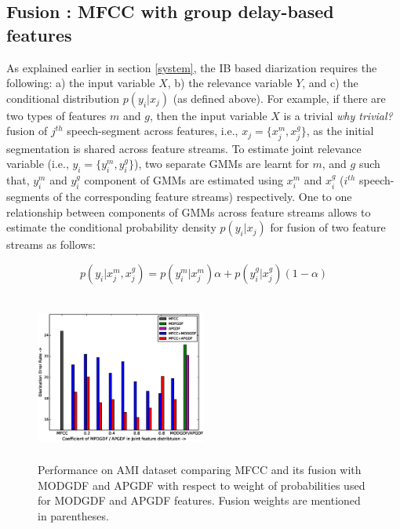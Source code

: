 \documentclass[conference]{IEEEtran}
\begin{document}
\subsection{Fusion : MFCC with group delay-based features}
\label{feature_fusion}
As explained earlier in section \ref{system}, the IB based diarization requires
the following: a) the input variable $X$, b) the relevance variable $Y$, and c)
the conditional distribution $p(y_i|x_j)$ (as defined above). For example, if
there are two types of features $m$ and $g$, then the input variable $X$ is a
trivial \textit{why trivial?} fusion of $j^{th}$ speech-segment across features,
i.e., $x_j = \{x^{m}_j,x^{g}_j\}$, as the initial segmentation is shared across
feature streams. To estimate joint relevance variable (i.e., $y_i = \{
y_i^{m},y_i^{g}\}$), two separate GMMs are learnt for $m$, and $g$ such
that, $y_i^{m}$ and $y_i^{g}$ component of GMMs are estimated using
$x^{m}_i$ and $x^{g}_i$ ($i^{th}$ speech-segments of the corresponding
feature streams) respectively. One to one relationship between
components of GMMs across feature streams allows to estimate the
conditional probability density $p(y_i|x_j)$ for fusion of two feature
streams as follows:

\begin{equation}
p(y_i|x^{m}_j,x^{g}_j) =   p(y_i^{m}|x^{m}_j) \alpha  +   p(y_i^{g}|x^{g}_j)
(1-\alpha)
\label{eq:feat_combs}
\end{equation}

\begin{figure}[h]
\centering
\includegraphics[width=0.5\textwidth,height=5.5cm]{figures/newFusionResults.eps}
\caption{Performance on AMI dataset comparing MFCC and its fusion with MODGDF
and APGDF with respect to weight of probabilities used for MODGDF and APGDF
features. Fusion weights are mentioned in parentheses.}
\label{fig:fusionResults}
\end{figure}
\end{document}
